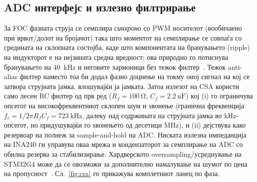 \documentclass[journal,onecolumn,11pt]{IEEEtran}
\begin{document}
\subsection{ADC интерфејс и излезно филтрирање}\label{sec:csafilter}
За FOC фазната струја се семплира \emph{синхроно} со PWM носителот (вообичаено при врвот/долот на
бројачот) така што моментот на семплирање се совпаѓа со средината на склопната состојба, каде што
компонентата на бранувањето (ripple) на индукторот е на нејзината средна вредност; ова природно го
потиснува бранувањето на \SI{40}{\kilo\hertz} и неговите хармоници без тежок филтер~\cite{an5346}.
Тежок anti-alias филтер наместо тоа би додал фазно доцнење на токму оној сигнал на кој се затвора
струјната јамка, влошувајќи ја јамката. Затоа излезот на CSA користи само лесен RC филтер од прв ред
($R_f=\SI{100}{\ohm}$, $C_f=\SI{2.2}{\nano\farad}$) кој (i) го ограничува опсегот на високофреквентниот
склопен шум и ѕвонење (гранична фреквенција $f_c=1/2\pi R_fC_f=\SI{723}{\kilo\hertz}$, далеку над
содржината на струјната јамка во kHz-опсегот, но придушувајќи го ѕвонењето од десетици MHz), и (ii)
дејствува како резервоар на полнеж за sample-and-hold на ADC. Ниската излезна импеданција на INA240 ги
управува оваа мрежа и кондензаторот за семплирање на ADC со обилна резерва за стабилизирање.
Хардверското oversampling/усреднување на STM32G4 може да се овозможи за дополнително намалување на
шумот по цена на пропусност~\cite{an5346}. Сл.~\ref{fig:csa} го прикажува комплетниот ланец по фаза.
\end{document}
